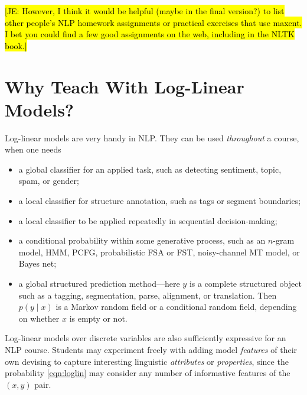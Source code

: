\documentclass[11pt,letterpaper]{article}
\newcommand{\Note}[1]{}
\renewcommand{\Note}[1]{\hl{[#1]}}  %
\newcommand{\NoteSigned}[3]{{\sethlcolor{#2}\Note{#1: #3}}}
\newcommand{\NoteJE}[1]{\NoteSigned{JE}{LightGreen}{#1}}
\begin{document}
\NoteJE{However, I
  think it would be helpful (maybe in the final version?) to list
  other people's NLP homework assignments or practical exercises that
  use maxent.  I bet you could find a few good assignments on the web,
  including in the NLTK book.}

\section{Why Teach With Log-Linear Models?}

Log-linear models are very handy in NLP.  They can be used {\em throughout} 
a course, when one needs 
\begin{itemize}
\item a global classifier for an applied task, such as detecting
  sentiment, topic, spam, or gender;
\item a local classifier for structure annotation,
  such as tags or segment boundaries;
\item a local classifier to be applied repeatedly in sequential decision-making;
\item a conditional probability within some generative process, such
  as an $n$-gram model, HMM, PCFG, probabilistic FSA or FST, noisy-channel MT model,
  or Bayes net;
\item a global structured prediction method---here $y$ is a complete
  structured object such as a tagging, segmentation, parse, alignment, or translation.  Then $p(y
  \mid x)$ is a Markov random field or a conditional random field,
  depending on whether $x$ is empty or not.
\end{itemize}  

Log-linear models over discrete variables are also sufficiently
expressive for an NLP course.  Students may experiment freely with
adding model \textit{features} of their own devising to capture interesting 
linguistic \textit{attributes} or \textit{properties}, 
since the probability \eqref{eqn:loglin} may consider any number of
informative features of the $(x,y)$ pair.
\end{document}
